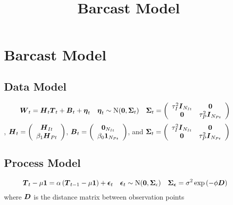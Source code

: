 \documentclass{article}\usepackage[]{graphicx}\usepackage[]{color}
\title{Barcast Model}
\def\bm#1{\mbox{\boldmath $#1$}}
\begin{document}
\maketitle
\section{Barcast Model}
%
\subsection{Data Model}
%
\begin{align}
\bm{W}_t & = \bm{H}_t \bm{T}_t + \bm{B}_t + \bm{\eta}_t & \bm{\eta}_t & \sim \mbox{N}(\bm{0}, \bm{\Sigma}_t) & \bm{\Sigma}_t & = \left( \begin{array}{cc} \tau_I^2 \bm{I}_{N_{It}} & \bm{0}\\ \bm{0} & \tau_P^2 \bm{I}_{N_{Pt}} \end{array} \right)
%
\end{align}
%
, $\bm{H}_t = \left( \begin{array}{c} \bm{H}_{It}\\ \beta_1 \bm{H}_{Pt} \end{array} \right)$, $\bm{B}_t = \left( \begin{array}{c} \bm{0}_{N_{It}}\\ \beta_0 \bm{1}_{N_{Pt}} \end{array} \right)$, and $\bm{\Sigma}_t = \left( \begin{array}{cc} \tau_I^2 \bm{I}_{N_{It}} & \bm{0}\\ \bm{0} & \tau_P^2 \bm{I}_{N_{Pt}} \end{array} \right)$
%
\subsection{Process Model}
%
\begin{align}
\bm{T}_t - \mu \bm{1} & = \alpha \left( \bm{T}_{t - 1} - \mu \bm{1} \right) + \bm{\epsilon}_t  & \bm{\epsilon}_t & \sim \mbox{N}(\bm{0}, \bm{\Sigma}_\epsilon) & \bm{\Sigma_\epsilon} & = \sigma^2 \exp{\left( - \phi \bm{D} \right)}
\end{align}
%
where $\bm{D}$ is the distance matrix between observation points
%
\end{document}
